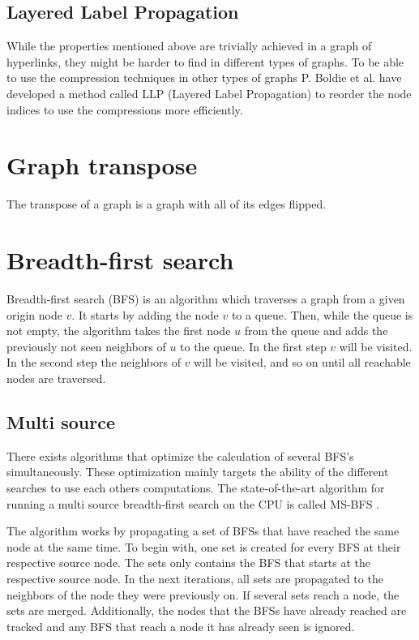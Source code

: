 \subsection{Layered Label Propagation}

While the properties mentioned above are trivially achieved in a graph of hyperlinks, they might be harder to find in different types of graphs. To be able to use the compression techniques in other types of graphs P. Boldie et al. have developed a method called LLP (Layered Label Propagation) \cite{llp} to reorder the node indices to use the compressions more efficiently. 

\section{Graph transpose}
The transpose of a graph is a graph with all of its edges flipped. 

\section{Breadth-first search}
Breadth-first search (BFS) is an algorithm which traverses a graph from a given origin node $v$. It starts by adding the node $v$ to a queue. Then, while the queue is not empty, the algorithm takes the first node $u$ from the queue and adds the previously not seen neighbors of $u$ to the queue. In the first step $v$ will be visited. In the second step the neighbors of $v$ will be visited, and so on until all reachable nodes are traversed.

\subsection{Multi source}
There exists algorithms that optimize the calculation of several BFS's simultaneously. These optimization mainly targets the ability of the different searches to use each others computations. The state-of-the-art algorithm for running a multi source breadth-first search on the CPU is called MS-BFS \cite{msbfs}.

The algorithm works by propagating a set of BFSs that have reached the same node at the same time. To begin with, one set is created for every BFS at their respective source node. The sets only contains the BFS that starts at the respective source node. In the next iterations, all sets are propagated to the neighbors of the node they were previously on. If several sets reach a node, the sets are merged. Additionally, the nodes that the BFSs have already reached are tracked and any BFS that reach a node it has already seen is ignored. 

